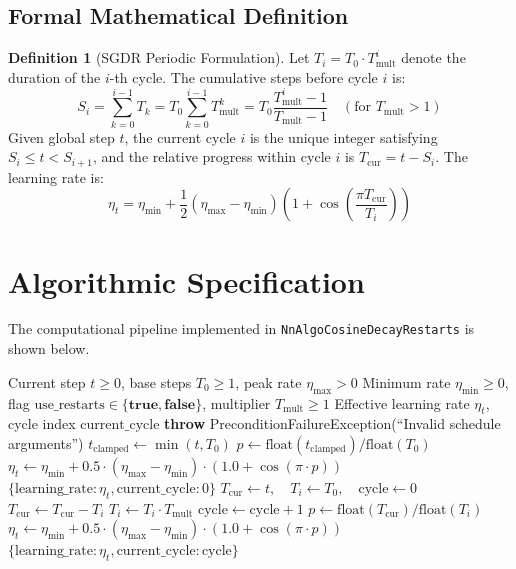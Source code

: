\documentclass[11pt,a4paper]{article}
\theoremstyle{definition}
\newtheorem{definition}{Definition}[section]
\begin{document}
\subsection{Formal Mathematical Definition}
\begin{definition}[SGDR Periodic Formulation]
Let $T_i = T_0 \cdot T_{\text{mult}}^i$ denote the duration of the $i$-th cycle. The cumulative steps before cycle $i$ is:
\begin{equation}
S_i = \sum_{k=0}^{i-1} T_k = T_0 \sum_{k=0}^{i-1} T_{\text{mult}}^k = T_0 \frac{T_{\text{mult}}^i - 1}{T_{\text{mult}} - 1} \quad (\text{for } T_{\text{mult}} > 1)
\end{equation}
Given global step $t$, the current cycle $i$ is the unique integer satisfying $S_i \le t < S_{i+1}$, and the relative progress within cycle $i$ is $T_{\text{cur}} = t - S_i$. The learning rate is:
\begin{equation}
\eta_t = \eta_{\min} + \frac{1}{2} (\eta_{\max} - \eta_{\min}) \left( 1 + \cos\left( \frac{\pi T_{\text{cur}}}{T_i} \right) \right) \label{eq:sgdr_formula}
\end{equation}
\end{definition}

\section{Algorithmic Specification}

The computational pipeline implemented in \texttt{NnAlgoCosineDecayRestarts} is shown below.

\begin{algorithm}[H]
\caption{Cosine Annealing and SGDR Warm Restarts Schedule}
\begin{algorithmic}[1]
\Require Current step $t \ge 0$, base steps $T_0 \ge 1$, peak rate $\eta_{\max} > 0$
\Require Minimum rate $\eta_{\min} \ge 0$, flag $\text{use\_restarts} \in \{\textbf{true}, \textbf{false}\}$, multiplier $T_{\text{mult}} \ge 1$
\Ensure Effective learning rate $\eta_t$, cycle index $\text{current\_cycle}$
    \State \textbf{throw} PreconditionFailureException(``Invalid schedule arguments'')
\EndIf
{}
    \State $t_{\text{clamped}} \gets \min(t, T_0)$
    \State $p \gets \text{float}(t_{\text{clamped}}) / \text{float}(T_0)$
    \State $\eta_t \gets \eta_{\min} + 0.5 \cdot (\eta_{\max} - \eta_{\min}) \cdot (1.0 + \cos(\pi \cdot p))$
    \State \Return $\{\text{learning\_rate}: \eta_t, \text{current\_cycle}: 0\}$
\EndIf
\State $T_{\text{cur}} \gets t, \quad T_i \gets T_0, \quad \text{cycle} \gets 0$
    \State $T_{\text{cur}} \gets T_{\text{cur}} - T_i$
    \State $T_i \gets T_i \cdot T_{\text{mult}}$
    \State $\text{cycle} \gets \text{cycle} + 1$
\EndWhile
\State $p \gets \text{float}(T_{\text{cur}}) / \text{float}(T_i)$
\State $\eta_t \gets \eta_{\min} + 0.5 \cdot (\eta_{\max} - \eta_{\min}) \cdot (1.0 + \cos(\pi \cdot p))$
\State \Return $\{\text{learning\_rate}: \eta_t, \text{current\_cycle}: \text{cycle}\}$
\end{algorithmic}
\end{algorithm}
\end{document}
